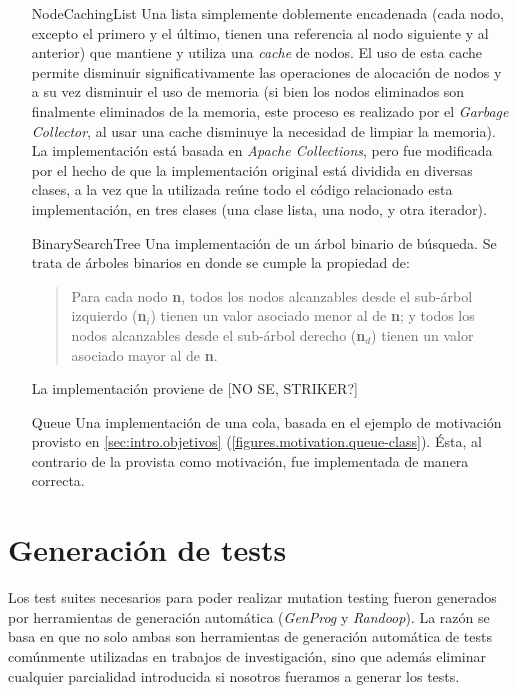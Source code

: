 \begin{enumerate}[leftmargin=.75cm,align=left,style=nextline]
	\item[NodeCachingList] Una lista simplemente doblemente encadenada (cada nodo, excepto el primero y el \'ultimo, tienen una referencia al nodo siguiente y al anterior) que mantiene y utiliza una \emph{cache} de nodos. El uso de esta cache permite disminuir significativamente las operaciones de alocaci\'on de nodos y a su vez disminuir el uso de memoria (si bien los nodos eliminados son finalmente eliminados de la memoria, este proceso es realizado por el \emph{Garbage Collector}, al usar una cache disminuye la necesidad de limpiar la memoria). La implementaci\'on est\'a basada en \emph{Apache Collections}, pero fue modificada por el hecho de que la implementaci\'on original est\'a dividida en diversas clases, a la vez que la utilizada re\'une todo el c\'odigo relacionado esta implementaci\'on, en tres clases (una clase lista, una nodo, y otra iterador).
	
	\item[BinarySearchTree] Una implementaci\'on de un \'arbol binario de b\'usqueda. Se trata de \'arboles binarios en donde se cumple la propiedad de:
	\begin{quote}
		Para cada nodo \textbf{n}, todos los nodos alcanzables desde el sub-\'arbol izquierdo (\textbf{n$_i$}) tienen un valor asociado menor al de \textbf{n}; y todos los nodos alcanzables desde el sub-\'arbol derecho (\textbf{n$_d$}) tienen un valor asociado mayor al de \textbf{n}.
	\end{quote}
	La implementaci\'on proviene de [NO SE, STRIKER?]
	
	\item[Queue] Una implementaci\'on de una cola, basada en el ejemplo de motivaci\'on provisto en \ref{sec:intro.objetivos} (\ref{figures.motivation.queue-class}). \'Esta, al contrario de la provista como motivaci\'on, fue implementada de manera correcta.
	
\end{enumerate}

\section{Generaci\'on de tests}
\label{sec:evaluation.tests}

Los test suites necesarios para poder realizar mutation testing fueron generados por herramientas de generaci\'on autom\'atica (\emph{GenProg} y \emph{Randoop}). La raz\'on se basa en que no solo ambas son herramientas de generaci\'on autom\'atica de tests com\'unmente utilizadas en trabajos de investigaci\'on, sino que adem\'as eliminar cualquier parcialidad introducida si nosotros fueramos a generar los tests.

